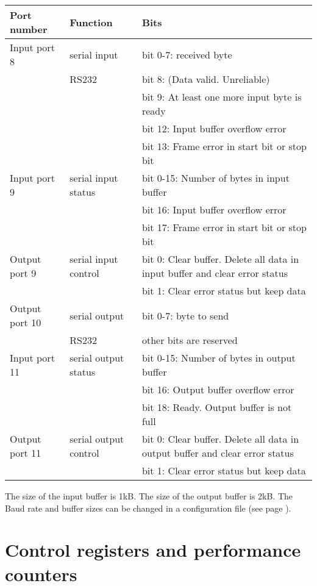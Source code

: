 \documentclass[11pt,a4paper,oneside,openright]{report}
\newcommand{\vv}{ \vspace{2mm} }   %
\begin{document}
\begin{tabular}{|l|l|l|} 
\hline
\bfseries Port number & \bfseries Function & \bfseries Bits \\ \hline
Input port 8 & serial input & bit 0-7: received byte \\
             & RS232        & bit 8: (Data valid. Unreliable) \\
             &              & bit 9: At least one more input byte is ready \\
             &              & bit 12: Input buffer overflow error \\
             &              & bit 13: Frame error in start bit or stop bit \\ \hline
Input port 9 & serial input status & bit 0-15: Number of bytes in input buffer \\
             &              & bit 16: Input buffer overflow error \\
             &              & bit 17: Frame error in start bit or stop bit\\ \hline
Output port 9 & serial input control & bit 0: Clear buffer. Delete all data in input buffer and clear error status \\
             &              & bit 1: Clear error status but keep data \\ \hline
Output port 10 & serial output & bit 0-7: byte to send \\
              & RS232         & other bits are reserved  \\ \hline
Input port 11 & serial output status & bit 0-15: Number of bytes in output buffer \\
              &              & bit 16: Output buffer overflow error \\
              &              & bit 18: Ready. Output buffer is not full \\ \hline
Output port 11 & serial output control & bit 0: Clear buffer. Delete all data in output buffer and clear error status \\
             &              & bit 1: Clear error status but keep data \\ \hline
\end{tabular}
\vv

The size of the input buffer is 1kB. The size of the output buffer is 2kB. The Baud rate and buffer sizes can be changed in a configuration file (see page \pageref{SettingConfiguration}).
\vv

\chapter{Control registers and performance counters} \label{Chap:ControlRegisters}
\end{document}
